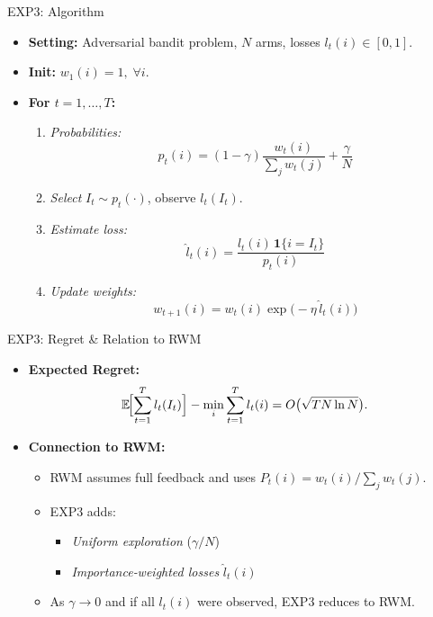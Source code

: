 \documentclass{beamer}
\begin{document}
\begin{frame}{EXP3: Algorithm}
  \begin{itemize}
    \item \textbf{Setting:} Adversarial bandit problem, $N$ arms, losses $l_t(i)\in[0,1]$.
    \item \textbf{Init:} $w_1(i)=1,\;\forall i$.
    \item \textbf{For $t=1,\dots,T$:}
      \begin{enumerate}
        \item \emph{Probabilities:}
          \[
            p_t(i)=(1-\gamma)\frac{w_t(i)}{\sum_j w_t(j)}+\frac{\gamma}{N}
          \]
        \item \emph{Select} $I_t\sim p_t(\cdot)$, observe $l_t(I_t)$.
        \item \emph{Estimate loss:}
          \[
            \hat l_t(i)=\frac{l_t(i)\,\mathbf{1}\{i=I_t\}}{p_t(i)}
          \]
        \item \emph{Update weights:}
          \[
            w_{t+1}(i)=w_t(i)\exp\bigl(-\eta\,\hat l_t(i)\bigr)
          \]
      \end{enumerate}
  \end{itemize}
\end{frame}

\begin{frame}{EXP3: Regret \& Relation to RWM}
  \begin{itemize}
    \item \textbf{Expected Regret:}
      \[
        \mathbb{E}\!\Bigl[\sum_{t=1}^T l_t(I_t)\Bigr]
        - \min_i\sum_{t=1}^T l_t(i)
        = O\bigl(\sqrt{T N \ln N}\bigr).
      \]
    \item \textbf{Connection to RWM:}
      \begin{itemize}
        \item RWM assumes full feedback and uses
          $P_t(i)=w_t(i)/\sum_j w_t(j)$.
        \item EXP3 adds:
          \begin{itemize}
            \item \emph{Uniform exploration} ($\gamma/N$)
            \item \emph{Importance‐weighted losses} $\hat l_t(i)$
          \end{itemize}
        \item As $\gamma\to0$ and if all $l_t(i)$ were observed, EXP3 reduces to RWM.
      \end{itemize}
  \end{itemize}
\end{frame}
\end{document}

